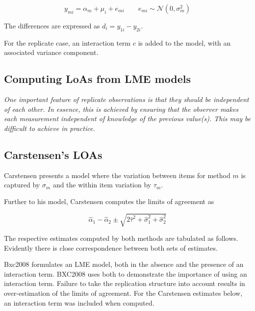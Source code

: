 \documentclass[12pt, a4paper]{report}
\theoremstyle{plain}
\theoremstyle{definition}
\theoremstyle{remark}
\begin{document}
%

\begin{equation}
y_{mi}  = \alpha_{m} + \mu_{i} + e_{mi} \qquad  e_{mi} \sim \mathcal{N}(0,\sigma^{2}_{m})
\end{equation}

The differences are expressed as $d_{i} = y_{1i} - y_{2i}$.

For the replicate case, an interaction term $c$ is added to the model, with an associated variance component.

\subsection{Computing LoAs from LME models}
%
\emph{
	One important feature of replicate observations is that they should be independent
	of each other. In essence, this is achieved by ensuring that the observer makes each
	measurement independent of knowledge of the previous value(s). This may be difficult
	to achieve in practice.}


\subsection{Carstensen's LOAs}
%
Carstensen presents a model where the variation between items for
method $m$ is captured by $\sigma_m$ and the within item variation
by $\tau_m$.

Further to his model, Carstensen computes the limits of agreement
as

\[
\hat{\alpha}_1 - \hat{\alpha}_2 \pm \sqrt{2 \hat{\tau}^2 +
	\hat{\sigma}^2_1 + \hat{\sigma}^2_2}
\]

%


The respective estimates computed by both methods are tabulated as follows. Evidently there is close correspondence between both sets of estimates.

Bxc2008 formulates an LME model, both in the absence and the presence of an interaction term. BXC2008 uses both to demonstrate the importance of using an interaction term. Failure to take the replication structure into
account results in over-estimation of the limits of agreement. 
For the Carstensen estimates below, an interaction term was included when computed.
\end{document}
